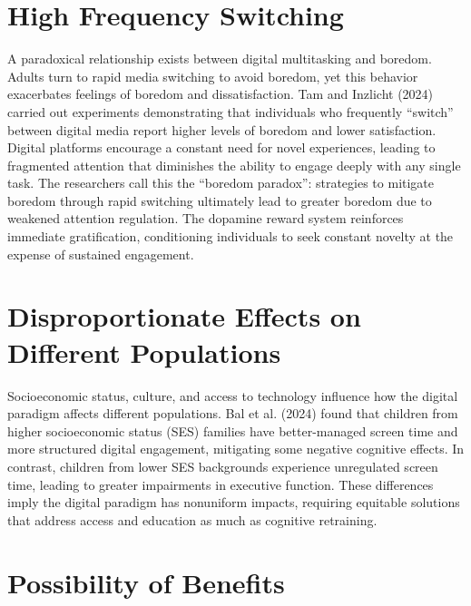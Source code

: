 \documentclass[12pt,letterpaper]{article}
\begin{document}
\section*{High Frequency Switching}

A paradoxical relationship exists between digital multitasking and boredom. Adults turn to rapid media switching to avoid boredom, yet this behavior exacerbates feelings of boredom and dissatisfaction. Tam and Inzlicht (2024) carried out experiments demonstrating that individuals who frequently ``switch'' between digital media report higher levels of boredom and lower satisfaction. Digital platforms encourage a constant need for novel experiences, leading to fragmented attention that diminishes the ability to engage deeply with any single task. The researchers call this the ``boredom paradox'': strategies to mitigate boredom through rapid switching ultimately lead to greater boredom due to weakened attention regulation. The dopamine reward system reinforces immediate gratification, conditioning individuals to seek constant novelty at the expense of sustained engagement.

\section*{Disproportionate Effects on Different Populations}

Socioeconomic status, culture, and access to technology influence how the digital paradigm affects different populations. Bal et al. (2024) found that children from higher socioeconomic status (SES) families have better-managed screen time and more structured digital engagement, mitigating some negative cognitive effects. In contrast, children from lower SES backgrounds experience unregulated screen time, leading to greater impairments in executive function. These differences imply the digital paradigm has nonuniform impacts, requiring equitable solutions that address access and education as much as cognitive retraining.

\section*{Possibility of Benefits}
\end{document}
